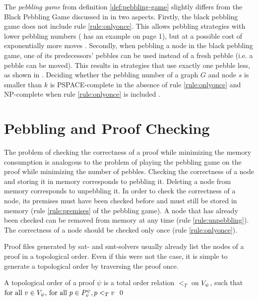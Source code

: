 \documentclass{llncs}
\begin{document}
\noindent
The \emph{pebbling game} from definition \ref{def:pebbling-game} slightly differs from the Black Pebbling Game discussed in \cite{hertel2007black,pippenger1982advances} in two aspects. Firstly, the black pebbling game  does not include rule \ref{rule:onlyonce}. This allows pebbling strategies with lower pebbling numbers (\cite{sethi1975complete} has an example on page 1), but at a possible cost of exponentially more moves \cite{van1979move}. Secondly, when pebbling a node in the black pebbling game, one of its predecessors' pebbles can be used instead of a fresh pebble (i.e. a pebble can be moved). This results in strategies that use exactly one pebble less, as shown in \cite{van1979move}.
Deciding whether the pebbling number of a graph $G$ and node $s$ is smaller than $k$ is PSPACE-complete in the absence of rule \ref{rule:onlyonce} \cite{gilbert1980pebbling} and NP-complete when rule \ref{rule:onlyonce} is included \cite{sethi1975complete}.



\section{Pebbling and Proof Checking}
\label{sec:pebblingchecking}

The problem of checking the correctness of a proof while minimizing the memory consumption is analogous to the problem of playing the pebbling game on the proof while minimizing the number of pebbles. Checking the correctness of a node and storing it in memory corresponds to pebbling it. Deleting a node from memory corresponds to unpebbling it. In order to check the correctness of a node, its premises must have been checked before and must still be stored in memory (rule \ref{rule:premises} of the pebbling game). A node that has already been checked can be removed from memory at any time (rule \ref{rule:unpebbling}). The correctness of a node should be checked only once (rule \ref{rule:onlyonce}).

Proof files generated by sat- and smt-solvers usually already list the nodes of a proof in a topological order. Even if this were not the case, it is simple to generate a topological order by traversing the proof once.

\begin{definition}
\label{def:topological-order}
A topological order of a proof $\psi$ is a total order relation $<_T$ on $V_{\psi}$, such that 
$
\text{for all } v \in V_{\psi} \text{, for all } p \in P_{v}^{\psi},
p <_T v
$
\qed
\end{definition}
\end{document}
